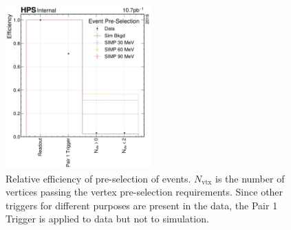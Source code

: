 \begin{figure}
  \centering
  \includegraphics[width=0.5\textwidth]{figures/hps/dataset/event-pre-selection-efficiency.pdf}
  \caption{Relative efficiency of pre-selection of events.
  $N_\mathrm{vtx}$ is the number of vertices passing the vertex pre-selection requirements.
  Since other triggers for different purposes are present in the data, the Pair 1 Trigger
  is applied to data but not to simulation.}
  \label{fig:event-pre-selection}
\end{figure}

